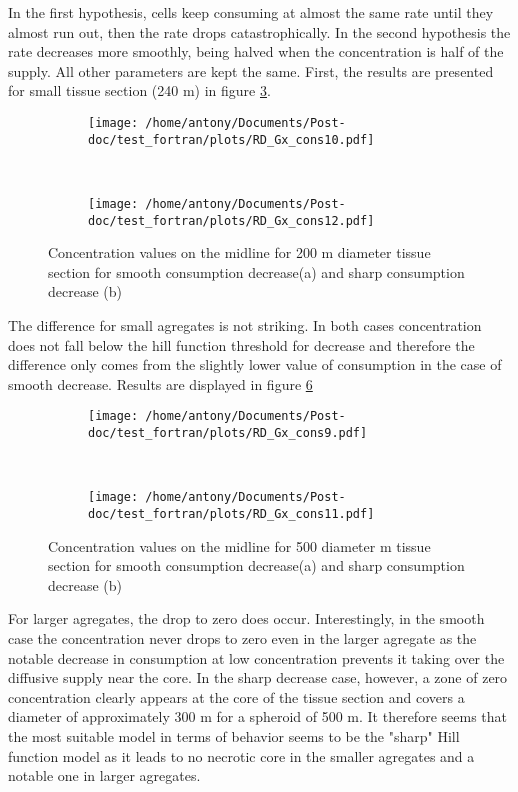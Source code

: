 \documentclass[11pt,a4paper]{article}
\begin{document}
In the first hypothesis, cells keep consuming at almost the same rate until they  almost run out, then the rate drops catastrophically. In the second hypothesis the rate decreases more smoothly, being halved when the concentration is half of the supply. All other parameters are kept the same. First, the results are presented for small tissue section (240 \textmu m) in figure \ref{RD_cons1012}.

\begin{figure}[ht!]
	\begin{subfigure}{0.45\textwidth}
	\centering
	\texttt{[image: /home/antony/Documents/Post-doc/test\_fortran/plots/RD\_Gx\_cons10.pdf]}
	\caption{ \label{RD_Gx_cons10}}
	\end{subfigure}
	~~
	\begin{subfigure}{0.45\textwidth}
	\texttt{[image: /home/antony/Documents/Post-doc/test\_fortran/plots/RD\_Gx\_cons12.pdf]}
		\caption{ \label{RD_Gx_cons12}}
	\end{subfigure}
	\caption{ Concentration values on the midline for 200 \textmu m diameter tissue section for smooth consumption decrease(a) and sharp consumption decrease (b) \label{RD_cons1012}}
\end{figure} 

The difference for small agregates is not striking. In both cases concentration does not fall below the hill function threshold for decrease and therefore the difference only comes from the slightly lower value of consumption in the case of smooth decrease. Results are displayed in figure \ref{RD_cons911} 

\begin{figure}[ht!]
	\begin{subfigure}{0.45\textwidth}
	\centering
	\texttt{[image: /home/antony/Documents/Post-doc/test\_fortran/plots/RD\_Gx\_cons9.pdf]}
	\caption{ \label{RD_Gx_cons9}}
	\end{subfigure}
	~~
	\begin{subfigure}{0.45\textwidth}
	\texttt{[image: /home/antony/Documents/Post-doc/test\_fortran/plots/RD\_Gx\_cons11.pdf]}
		\caption{ \label{RD_Gx_cons11}}
	\end{subfigure}
	\caption{ Concentration values on the midline for 500 \textmu diameter m tissue section for smooth consumption decrease(a) and sharp consumption decrease (b) \label{RD_cons911}}
\end{figure} 

For larger agregates, the drop to zero does occur. Interestingly, in the smooth case the concentration never drops to zero even in the larger agregate as the notable decrease in consumption at low concentration prevents it taking over the diffusive supply near the core. In the sharp decrease case, however, a zone of zero concentration clearly appears at the core of the tissue section and covers a diameter of approximately  300 \textmu m for a spheroid of 500 \textmu m.  It therefore seems that the most suitable model in terms of behavior seems to be the "sharp" Hill function model as it leads to no necrotic core in the smaller agregates and a notable one in larger agregates.
\end{document}

